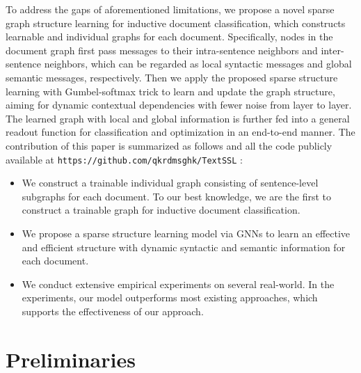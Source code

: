 \documentclass[letterpaper]{article} %
\begin{document}
To address the gaps of aforementioned limitations, we propose a novel sparse graph structure learning for inductive document classification, which constructs learnable and individual graphs for each document.
Specifically, nodes in the document graph first pass messages to their intra-sentence neighbors and inter-sentence neighbors, which can be regarded as local syntactic messages and global semantic messages, respectively. Then we apply the proposed sparse structure learning with Gumbel-softmax trick to learn and update the graph structure, aiming for dynamic contextual dependencies with fewer noise from layer to layer. The learned graph with local and global information is further fed into a general readout function for classification and optimization in an end-to-end manner.
The contribution of this paper is summarized as follows and all the code
publicly available at \texttt{https://github.com/qkrdmsghk/TextSSL} :
\begin{itemize}
\item We construct a trainable individual graph consisting of sentence-level subgraphs for each document. To our best knowledge, we are the first to construct a trainable graph for inductive document classification.
\item We propose a sparse structure learning model via GNNs to learn an effective and efficient structure with dynamic syntactic and semantic information for each document.
\item We conduct extensive empirical experiments on several real-world. In the experiments, our model outperforms most existing approaches, which supports the effectiveness of our approach.
\end{itemize}

\section{Preliminaries}
\label{sec:pre}
\end{document}

